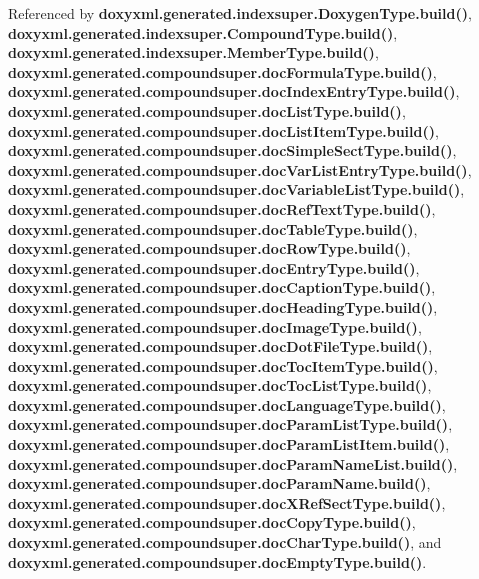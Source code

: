 Referenced by {\bf doxyxml.\+generated.\+indexsuper.\+Doxygen\+Type.\+build()}, {\bf doxyxml.\+generated.\+indexsuper.\+Compound\+Type.\+build()}, {\bf doxyxml.\+generated.\+indexsuper.\+Member\+Type.\+build()}, {\bf doxyxml.\+generated.\+compoundsuper.\+doc\+Formula\+Type.\+build()}, {\bf doxyxml.\+generated.\+compoundsuper.\+doc\+Index\+Entry\+Type.\+build()}, {\bf doxyxml.\+generated.\+compoundsuper.\+doc\+List\+Type.\+build()}, {\bf doxyxml.\+generated.\+compoundsuper.\+doc\+List\+Item\+Type.\+build()}, {\bf doxyxml.\+generated.\+compoundsuper.\+doc\+Simple\+Sect\+Type.\+build()}, {\bf doxyxml.\+generated.\+compoundsuper.\+doc\+Var\+List\+Entry\+Type.\+build()}, {\bf doxyxml.\+generated.\+compoundsuper.\+doc\+Variable\+List\+Type.\+build()}, {\bf doxyxml.\+generated.\+compoundsuper.\+doc\+Ref\+Text\+Type.\+build()}, {\bf doxyxml.\+generated.\+compoundsuper.\+doc\+Table\+Type.\+build()}, {\bf doxyxml.\+generated.\+compoundsuper.\+doc\+Row\+Type.\+build()}, {\bf doxyxml.\+generated.\+compoundsuper.\+doc\+Entry\+Type.\+build()}, {\bf doxyxml.\+generated.\+compoundsuper.\+doc\+Caption\+Type.\+build()}, {\bf doxyxml.\+generated.\+compoundsuper.\+doc\+Heading\+Type.\+build()}, {\bf doxyxml.\+generated.\+compoundsuper.\+doc\+Image\+Type.\+build()}, {\bf doxyxml.\+generated.\+compoundsuper.\+doc\+Dot\+File\+Type.\+build()}, {\bf doxyxml.\+generated.\+compoundsuper.\+doc\+Toc\+Item\+Type.\+build()}, {\bf doxyxml.\+generated.\+compoundsuper.\+doc\+Toc\+List\+Type.\+build()}, {\bf doxyxml.\+generated.\+compoundsuper.\+doc\+Language\+Type.\+build()}, {\bf doxyxml.\+generated.\+compoundsuper.\+doc\+Param\+List\+Type.\+build()}, {\bf doxyxml.\+generated.\+compoundsuper.\+doc\+Param\+List\+Item.\+build()}, {\bf doxyxml.\+generated.\+compoundsuper.\+doc\+Param\+Name\+List.\+build()}, {\bf doxyxml.\+generated.\+compoundsuper.\+doc\+Param\+Name.\+build()}, {\bf doxyxml.\+generated.\+compoundsuper.\+doc\+X\+Ref\+Sect\+Type.\+build()}, {\bf doxyxml.\+generated.\+compoundsuper.\+doc\+Copy\+Type.\+build()}, {\bf doxyxml.\+generated.\+compoundsuper.\+doc\+Char\+Type.\+build()}, and {\bf doxyxml.\+generated.\+compoundsuper.\+doc\+Empty\+Type.\+build()}.



